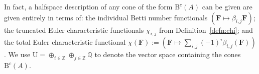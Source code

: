 \documentclass[12pt]{amsart}
\theoremstyle{definition}
\theoremstyle{remark}
\newcommand{\ZZ}{\mathbb{Z}}
\newcommand{\QQ}{\mathbb{Q}}
\newcommand{\UU}{\mathrm{U}}
\newcommand{\cc}{c}
\newcommand{\FF}{\mathbf{F}}
\newcommand{\Gbull}{\mathbf{G}}
\newcommand{\BBQ}{\mathrm{B}}
\begin{document}

In fact, a halfspace description of any cone of the form $\BBQ^{\cc}(A)$ can be given are given entirely in terms of: the individual Betti number functionals $(\FF\mapsto \beta_{i,j}\FF)$; the truncated Euler characteristic functionals $\chi_{i,j}$ from Definition~\ref{defn:chi}; and the total Euler characteristic functional $\chi(\FF):=(\FF\mapsto \sum_{i,j}(-1)^i \beta_{i,j}(\FF))$.  We use $\UU= \oplus_{i\in \ZZ} \oplus_{j\in \ZZ}\QQ$ to denote the vector space containing the cones $\BBQ^{\cc}(A)$.
\end{document}
